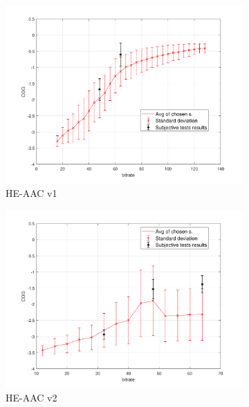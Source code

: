 \begin{figure}[h]
\begin{subfigure}{.5\textwidth}
        \centering
        \includegraphics[width=1\linewidth]{pic/objective/hePemoq.pdf}
        \caption{HE-AAC v1}
        \label{app:pem:sub3}
    \end{subfigure}%
        \begin{subfigure}{.5\textwidth}
        \centering
        \includegraphics[width=1\linewidth]{pic/objective/hev2Pemoq.pdf}
        \caption{HE-AAC v2}
        \label{app:pem:sub4}
    \end{subfigure}%
        \\
        \begin{subfigure}{.5\textwidth}
        \centering

\end{subfigure}
\end{figure}
